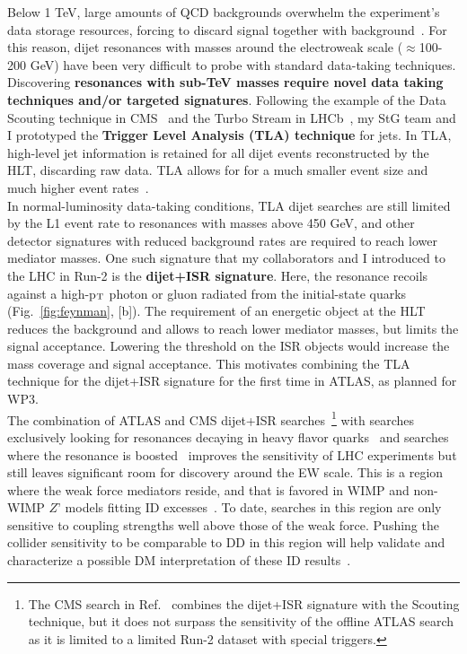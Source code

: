 Below 1 TeV, large amounts of QCD backgrounds overwhelm the experiment’s data storage resources, forcing to discard signal together with background~\cite{ToBeCited}. %
For this reason, dijet resonances with masses around the electroweak scale ($\approx$100-200 GeV) have been very difficult to probe with standard data-taking techniques. 
\\
\indent
Discovering \textbf{resonances with sub-TeV masses require novel data taking techniques and/or targeted signatures}. 
Following the example of the Data Scouting technique in CMS~\cite{ToBeCited} and the Turbo Stream in LHCb~\cite{ToBeCited}, my StG team and I prototyped the \textbf{Trigger Level Analysis (TLA) technique} for jets. 
In TLA, high-level jet information is retained for all dijet events reconstructed by the HLT, discarding raw data. 
TLA allows for for a much smaller event size and much higher event rates~\cite{ToBeCited}.%
\\
\indent
In normal-luminosity data-taking conditions, TLA dijet searches are still limited by the L1 event rate to resonances with masses above 450 GeV, 
and other detector signatures with reduced background rates are required to reach lower mediator masses. 
One such signature that my collaborators and I introduced to the LHC in Run-2 is the \textbf{dijet+ISR signature}. 
Here, the resonance recoils against a high-p$_{\rm{T}}$ photon or gluon radiated from the initial-state quarks (Fig.~\ref{fig:feynman}, [b]). 
The requirement of an energetic object at the HLT reduces the background and allows to reach lower mediator masses, 
but limits the signal acceptance. 
Lowering the threshold on the ISR objects would increase the mass coverage and signal acceptance.
This motivates combining the TLA technique for the dijet+ISR signature for the first time in ATLAS, as planned for WP3. 
\\
\indent
The combination of ATLAS and CMS dijet+ISR searches~\cite{ToBeCited}\footnote{The CMS search in Ref.~\cite{ToBeCited} %
combines the dijet+ISR signature with the Scouting technique, but it does not surpass the sensitivity of the offline ATLAS search as it is limited to a limited Run-2 dataset with special triggers.}
with searches exclusively looking for resonances decaying in heavy flavor quarks~\cite{ToBeCited} %
and searches where the resonance is boosted~\cite{ToBeCited} %
improves the sensitivity of LHC experiments but still leaves significant room for discovery around the EW scale. 
This is a region where the weak force mediators reside, and that is favored in WIMP and non-WIMP $Z’$ models fitting ID excesses~\cite{ToBeCited}. %
To date, searches in this region are only sensitive to coupling strengths well above those of the weak force. 
Pushing the collider sensitivity to be comparable to DD in this region will help validate and characterize a possible DM interpretation of these ID results~\cite{Ellis:2018xal,Kang:2020huh}.

